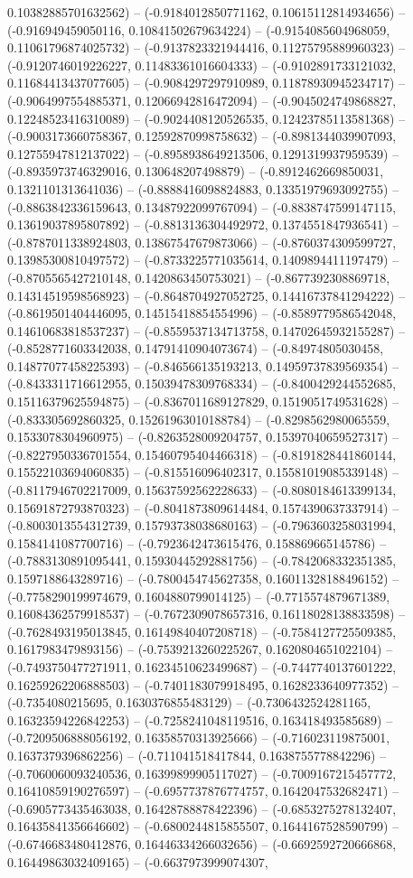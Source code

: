0.10382885701632562) -- (-0.9184012850771162, 0.10615112814934656) -- (-0.916949459050116, 0.10841502679634224) -- (-0.9154085604968059, 0.11061796874025732) -- (-0.9137823321944416, 0.11275795889960323) -- (-0.9120746019226227, 0.11483361016604333) -- (-0.9102891733121032, 0.11684413437077605) -- (-0.9084297297910989, 0.11878930945234717) -- (-0.9064997554885371, 0.12066942816472094) -- (-0.9045024749868827, 0.12248523416310089) -- (-0.9024408120526535, 0.12423785113581368) -- (-0.9003173660758367, 0.12592870998758632) -- (-0.8981344039907093, 0.12755947812137022) -- (-0.8958938649213506, 0.1291319937959539) -- (-0.8935973746329016, 0.130648207498879) -- (-0.8912462669850031, 0.1321101313641036) -- (-0.8888416098824883, 0.13351979693092755) -- (-0.8863842336159643, 0.13487922099767094) -- (-0.8838747599147115, 0.13619037895807892) -- (-0.8813136304492972, 0.1374551847936541) -- (-0.8787011338924803, 0.13867547679873066) -- (-0.8760374309599727, 0.13985300810497572) -- (-0.8733225771035614, 0.1409894411197479) -- (-0.8705565427210148, 0.1420863450753021) -- (-0.8677392308869718, 0.14314519598568923) -- (-0.8648704927052725, 0.14416737841294222) -- (-0.8619501404446095, 0.14515418854554996) -- (-0.8589779586542048, 0.14610683818537237) -- (-0.8559537134713758, 0.14702645932155287) -- (-0.8528771603342038, 0.14791410904073674) -- (-0.84974805030458, 0.14877077458225393) -- (-0.846566135193213, 0.14959737839569354) -- (-0.8433311716612955, 0.15039478309768334) -- (-0.8400429244552685, 0.15116379625594875) -- (-0.8367011689127829, 0.1519051749531628) -- (-0.833305692860325, 0.15261963010188784) -- (-0.8298562980065559, 0.1533078304960975) -- (-0.8263528009204757, 0.15397040659527317) -- (-0.8227950336701554, 0.15460795404466318) -- (-0.8191828441860144, 0.15522103694060835) -- (-0.815516096402317, 0.15581019085339148) -- (-0.8117946702217009, 0.15637592562228633) -- (-0.8080184613399134, 0.15691872793870323) -- (-0.8041873809614484, 0.1574390637337914) -- (-0.8003013554312739, 0.15793738038680163) -- (-0.7963603258031994, 0.1584141087700716) -- (-0.7923642473615476, 0.158869665145786) -- (-0.7883130891095441, 0.15930445292881756) -- (-0.7842068332351385, 0.1597188643289716) -- (-0.7800454745627358, 0.16011328188496152) -- (-0.7758290199974679, 0.1604880799014125) -- (-0.7715574879671389, 0.16084362579918537) -- (-0.7672309078657316, 0.16118028138833598) -- (-0.7628493195013845, 0.16149840407208718) -- (-0.7584127725509385, 0.1617983479893156) -- (-0.7539213260225267, 0.1620804651022104) -- (-0.7493750477271911, 0.16234510623499687) -- (-0.7447740137601222, 0.16259262206888503) -- (-0.7401183079918495, 0.1628233640977352) -- (-0.7354080215695, 0.1630376855483129) -- (-0.7306432524281165, 0.16323594226842253) -- (-0.7258241048119516, 0.163418493585689) -- (-0.7209506888056192, 0.16358570313925666) -- (-0.716023119875001, 0.1637379396862256) -- (-0.711041518417844, 0.1638755778842296) -- (-0.7060060093240536, 0.16399899905117027) -- (-0.7009167215457772, 0.16410859190276597) -- (-0.6957737876774757, 0.1642047532682471) -- (-0.6905773435463038, 0.16428788878422396) -- (-0.6853275278132407, 0.16435841356646602) -- (-0.6800244815855507, 0.1644167528590799) -- (-0.6746683480412876, 0.16446334266032656) -- (-0.6692592720666868, 0.16449863032409165) -- (-0.6637973999074307, 